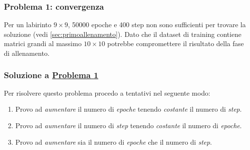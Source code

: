\subsubsection{Problema 1: convergenza}
\label{sec:problema1}

Per un labirinto $9 \times 9$, 50000 epoche e 400 step non sono sufficienti per trovare la soluzione (vedi \autoref{sec:primoallenamento}). Dato che il dataset di training contiene matrici grandi al massimo $10 \times 10$ potrebbe compromettere il risultato della fase di allenamento.

\subsubsection{Soluzione a \hyperref[sec:problema1]{Problema 1}}
\label{sec:solprob1}

Per risolvere questo problema procedo a tentativi nel seguente modo:

\begin{enumerate}
	\item Provo ad \textit{aumentare} il numero di \textit{epoche} tenendo \textit{costante} il numero di \textit{step}.
	\item Provo ad \textit{aumentare} il numero di \textit{step} tenendo \textit{costante} il numero di \textit{epoche}.
	\item Provo ad \textit{aumentare} sia il numero di \textit{epoche} che il numero di \textit{step}.
\end{enumerate}

